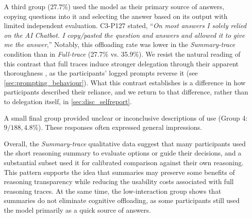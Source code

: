 \documentclass[manuscript,review,anonymous]{acmart}
\newcommand{\daniela}[1]{\textcolor{colordaniela}{\textbf{\faComment~Daniela:} #1}}
\begin{document}
A third group (27.7\%) used the model as their primary source of answers, copying questions into it and selecting the answer based on its output with limited independent evaluation. C3-P127 stated, ``\textit{On most answers I solely relied on the AI Chatbot. I copy/pasted the question and answers and allowed it to give me the answer},'' Notably, this offloading rate was lower in the \textit{Summary-trace} condition than in \textit{Full-trace} (27.7\% vs. 35.9\%). %
We resist the natural reading of this contrast that full traces induce stronger delegation through their apparent thoroughness \cite{10.1145/3397481.3450639, eiband2019impact}, as the participants' logged prompts reverse it (see \autoref{sec:prompting_behaviour}). What this contrast establishes is a difference in how participants described their reliance, and we return to that difference, rather than to delegation itself, in \autoref{sec:disc_selfreport}.


A small final group provided unclear or inconclusive descriptions of use (Group 4: $9/188, 4.8\%$). These responses often expressed general impressions. %

Overall, the \textit{Summary-trace} qualitative data suggest that many participants used the short reasoning summary to evaluate options or guide their decisions, and a substantial subset used it for calibrated comparison against their own reasoning. This pattern supports the idea that summaries may preserve some benefits of reasoning transparency while reducing the usability costs associated with full reasoning traces. At the same time, the low-interaction group shows that summaries do not eliminate cognitive offloading, as some participants still used the model primarily as a quick source of answers. %
\end{document}
